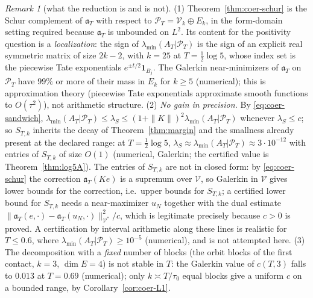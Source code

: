 \documentclass[11pt]{amsart}
\theoremstyle{definition}
\theoremstyle{remark}
\newtheorem{remark}[theorem]{Remark}
\newcommand{\PT}{\mathcal P_T}
\newcommand{\lamA}{\lambda_{\min}(A_T|\PT)}
\begin{document}
\begin{remark}[what the reduction is and is not]\label{rem:coer-honest}
(1) Theorem~\ref{thm:coer-schur} is the Schur complement of $\mathfrak a_T$ with respect to $\PT=\mathcal V_k\oplus E_k$,
in the form-domain setting required because $\mathfrak a_T$ is unbounded on $L^2$. Its content for the
positivity question is a \emph{localization}: the sign of $\lamA$ is the sign of an explicit real symmetric matrix of
size $2k-2$, with $k=25$ at $T=\frac12\log5$, whose index set is the piecewise Tate exponentials
$e^{\pm t/2}\mathbf 1_{B_j}$. The Galerkin near-minimizers of $\mathfrak a_T$ on $\PT$ have $99\%$ or more of their mass in
$E_k$ for $k\ge5$ (numerical); this is approximation theory (piecewise Tate exponentials approximate
smooth functions to $O(\tau^2)$), not arithmetic structure.
(2) \emph{No gain in precision.} By \eqref{eq:coer-sandwich}, $\lamA\le\lambda_S\le(1+\|K\|)^2\lamA$ whenever
$\lambda_S\le c$; so $S_{T,k}$ inherits the decay of Theorem~\ref{thm:margin} and the smallness already present at
the declared range: at $T=\frac12\log5$, $\lambda_S\approx\lamA\approx3\cdot10^{-12}$ with entries of $S_{T,k}$ of size
$O(1)$ (numerical, Galerkin; the certified value is Theorem~\ref{thm:log5A}). The entries of $S_{T,k}$ are not in
closed form: by \eqref{eq:coer-schur} the correction $\mathfrak a_T(Ke)$ is a supremum over $\mathcal V$, so Galerkin in
$\mathcal V$ gives lower bounds for the correction, i.e.\ upper bounds for $S_{T,k}$; a certified lower bound for $S_{T,k}$
needs a near-maximizer $u_N$ together with the dual estimate $\|\mathfrak a_T(e,\cdot)-\mathfrak a_T(u_N,\cdot)\|^2_{\mathcal V^*}/c$,
which is legitimate precisely because $c>0$ is proved. A certification by interval arithmetic along these lines is
realistic for $T\le0.6$, where $\lamA\ge10^{-5}$ (numerical), and is not attempted here.
(3) The decomposition with a \emph{fixed} number of blocks (the orbit blocks of the first contact, $k=3$, $\dim E=4$)
is not stable in $T$: the Galerkin value of $c(T,3)$ falls to $0.013$ at $T=0.69$ (numerical); only
$k\asymp T/\tau_0$ equal blocks give a uniform $c$ on a bounded range, by Corollary~\ref{cor:coer-L1}.
\end{remark}
\end{document}
